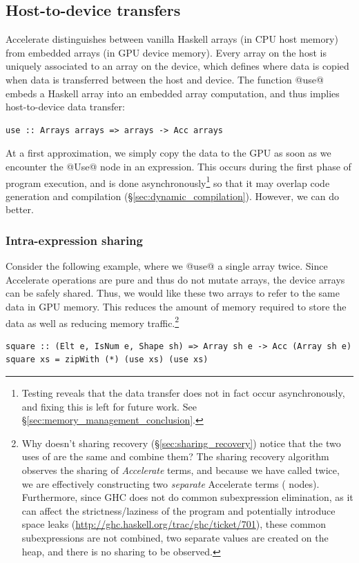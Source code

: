\subsection{Host-to-device transfers}
\label{sec:host_device_transfers}

Accelerate distinguishes between vanilla Haskell arrays (in CPU host memory)
from embedded arrays (in GPU device memory). Every array on the host is
uniquely associated to an array on the device, which defines where data is
copied when data is transferred between the host and device. The function
@use@ embeds a Haskell array into an embedded array computation, and thus
implies host-to-device data transfer:
%
\begin{lstlisting}[style=haskell,numbers=none]
use :: Arrays arrays => arrays -> Acc arrays
\end{lstlisting}
%

At a first approximation, we simply copy the data to the GPU as soon as we
encounter the @Use@ node in an expression. This occurs during the first
phase of program execution, and is done asynchronously\footnote{Testing reveals
that the data transfer does not in fact occur asynchronously, and fixing this is
left for future work. See \S\ref{sec:memory_management_conclusion}.}
so that it may overlap code generation and compilation
(\S\ref{sec:dynamic_compilation}). However, we can do better.

\subsubsection{Intra-expression sharing}

Consider the following example, where we @use@ a single array twice. Since
Accelerate operations are pure and thus do not mutate arrays, the device arrays
can be safely shared. Thus, we would like these two arrays to refer to the same
data in GPU memory. This reduces the amount of memory required to store the
data as well as reducing memory traffic.\footnote{Why doesn't sharing recovery
(\S\ref{sec:sharing_recovery}) notice that the two uses of  are
the same and combine them? The sharing recovery algorithm observes the sharing
of \emph{Accelerate} terms, and because we have called  twice, we
are effectively constructing two \emph{separate} Accelerate terms
( nodes). Furthermore, since GHC does not do common subexpression
elimination, as it can affect the strictness/laziness of the program and
potentially introduce space leaks
(\url{http://ghc.haskell.org/trac/ghc/ticket/701}), these common subexpressions
are not combined, two separate values are created on the heap, and there is no
sharing to be observed.}
%
\begin{lstlisting}[style=haskell]
square :: (Elt e, IsNum e, Shape sh) => Array sh e -> Acc (Array sh e)
square xs = zipWith (*) (use xs) (use xs)
\end{lstlisting}

